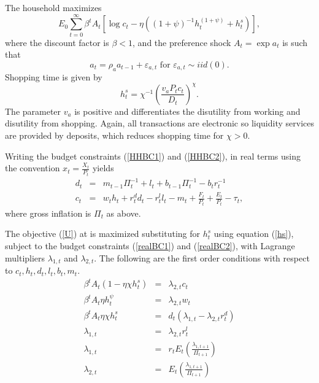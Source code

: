 \documentclass[]{article}
\begin{document}
The household maximizes%
\begin{equation}
E_{0}\sum\limits_{t=0}^{\infty } \beta ^{t} A_{t}\left[ \log{c}_{t}-\eta
\left( \left(1+\psi\right)^{-1}h_{t}^{\left(1+\psi\right)}+h_{t}^{s}\right) \right] ,  \label{U}
\end{equation}%
where the discount factor is $\beta <1$, and the preference shock $%
A_{t}=\exp a_{t}$ is such that%
\begin{equation}
a_{t}=\rho _{a}a_{t-1}+\varepsilon _{a,t} \text{ for }\varepsilon _{a,t}\sim
iid\left( 0\right).
\label{a}
\end{equation}
Shopping time is given by 
\begin{equation}
h_{t}^{s}=\chi ^{-1}\left( \frac{v_{a}P_{t}c_{t}}{D_{t}}\right) ^{\chi }.
\label{hs}
\end{equation}%
The parameter $v_{a}$ is positive and differentiates the disutility from
working and disutility from shopping. Again, all transactions are electronic so liquidity services
are provided by deposits, which reduces shopping time for $\chi>0$.

Writing the budget constraints (\ref{HHBC1}) and (\ref{HHBC2}), in real
terms using the convention $x_{t}=\frac{X_{t}}{P_{t}}$ yields%
\begin{eqnarray}
d_{t} &=&m_{t-1}\Pi_{t}^{-1}+l_{t}+b_{t-1}\Pi_{t}^{-1}-b_{t}r_{t}^{-1}  \label{realBC1} \\
c_{t} &=&w_{t}h_{t}+r_{t}^{d}d_{t}-r_{t}^{l}l_{t}-m_{t}+\frac{F_{t}}{P_{t}}+
\frac{E_{t}}{P_{t}}-\tau _{t}, \label{realBC2}
\end{eqnarray}%
where gross inflation is $\Pi _{t}$ as above. 

The objective (\ref{U}) at is maximized substituting for $h_{t}^{s}$
using equation (\ref{hs}), subject to the budget constraints (\ref{realBC1}) and (\ref{realBC2}), with Lagrange
multipliers $\lambda _{1,t}$ and $\lambda _{2,t}$. The following are the first order conditions with respect to
$c_{t},h_{t},d_{t},l_{t},b_{t},m_{t}$.%
\begin{eqnarray}
\beta^{t}A_{t}\left(1-\eta \chi h_{t}^{s}\right) &=&\lambda _{2,t}c_{t} \label{foc c} \\
\beta^{t}A_{t}\eta h_{t}^{\psi} &=&\lambda _{2,t}w_{t} \label{foc h} \\
\beta^{t}A_{t}\eta \chi h_{t}^{s} &=&d_{t}\left(\lambda _{1,t}-\lambda
_{2,t}r_{t}^{d}\right) \label{foc d} \\
\lambda _{1,t} &=&\lambda _{2,t}r_{t}^{l} \label{foc l} \\
\lambda _{1,t} &=& r_{t}E_{t}\left(\frac{\lambda _{1,t+1}}{\Pi_{t+1}}\right) \label{foc b}\\
\lambda _{2,t} &=&E_{t}\left(\frac{\lambda _{1,t+1}}{\Pi _{t+1}}\right) \label{foc m}
\end{eqnarray}
\end{document}
